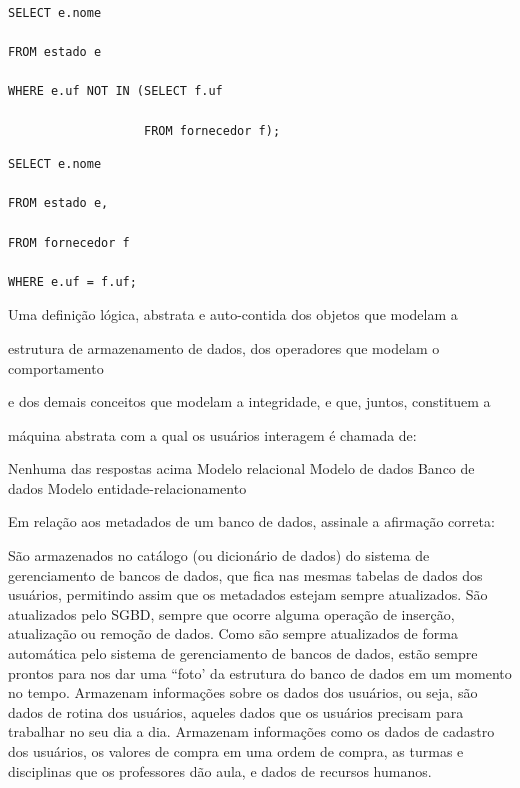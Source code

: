 \documentclass[12pt, addpoints]{exam}
\begin{document}
\begin{questions}
\begin{choices}
\choice \begin{verbatim}SELECT e.nome

FROM estado e

WHERE e.uf NOT IN (SELECT f.uf

                   FROM fornecedor f);

\end{verbatim}


\choice \begin{verbatim}SELECT e.nome

FROM estado e,

FROM fornecedor f

WHERE e.uf = f.uf;

\end{verbatim}


\end{choices}

\question

Uma definição lógica, abstrata e auto-contida dos objetos que modelam a

estrutura de armazenamento de dados, dos operadores que modelam o comportamento

e dos demais conceitos que modelam a integridade, e que, juntos, constituem a

máquina abstrata com a qual os usuários interagem é chamada de:


\begin{choices}
\choice Nenhuma das respostas acima
\choice Modelo relacional
\choice Modelo de dados
\choice Banco de dados
\choice Modelo entidade-relacionamento
\end{choices}

\question

Em relação aos metadados de um banco de dados, assinale a afirmação correta:
\begin{choices}
\choice São armazenados no catálogo (ou dicionário de dados) do sistema de gerenciamento de bancos de dados, que fica nas mesmas tabelas de dados dos usuários, permitindo assim que os metadados estejam sempre atualizados.
\choice São atualizados pelo SGBD, sempre que ocorre alguma operação de inserção, atualização ou remoção de dados.
\choice Como são sempre atualizados de forma automática pelo sistema de gerenciamento de bancos de dados, estão sempre prontos para nos dar uma ``foto' da estrutura do banco de dados em um momento no tempo.
\choice Armazenam informações sobre os dados dos usuários, ou seja, são dados de rotina dos usuários, aqueles dados que os usuários precisam para trabalhar no seu dia a dia.
\choice Armazenam informações como os dados de cadastro dos usuários, os valores de compra em uma ordem de compra, as turmas e disciplinas que os professores dão aula, e dados de recursos humanos.
\end{choices}


\end{questions}
\end{document}
